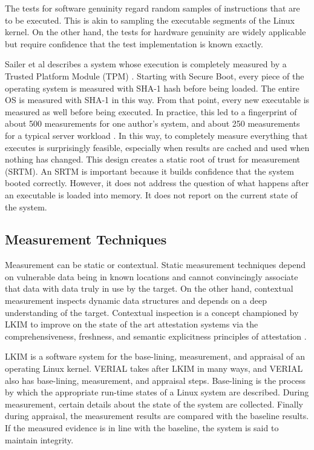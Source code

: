 \documentclass[a4paper,twoside]{article}
\begin{document}
The tests for software genuinity regard random samples of instructions that are to be executed. This is akin to sampling the executable segments of the Linux kernel. On the other hand, the tests for hardware genuinity are widely applicable but require confidence that the test implementation is known exactly.

Sailer et al describes a system whose execution is completely measured by a Trusted Platform Module (TPM) \cite{TCGIMA}. Starting with Secure Boot, every piece of the operating system is measured with SHA-1 hash before being loaded. The entire OS is measured with SHA-1 in this way. From that point, every new executable is measured as well before being executed. In practice, this led to a fingerprint of about 500 measurements for one author's system, and about 250 measurements for a typical server workload \cite{TCGIMA}. In this way, to completely measure everything that executes is surprisingly feasible, especially when results are cached and used when nothing has changed. This design creates a static root of trust for measurement (SRTM). An SRTM is important because it builds confidence that the system booted correctly. However, it does not address the question of what happens after an executable is loaded into memory. It does not report on the current state of the system.

\subsection{Measurement Techniques}

Measurement can be static or contextual. Static measurement techniques depend on vulnerable data being in known locations and cannot convincingly associate that data with data truly in use by the target. On the other hand, contextual measurement inspects dynamic data structures and depends on a deep understanding of the target. Contextual inspection is a concept championed by LKIM to improve on the state of the art attestation systems via the comprehensiveness, freshness, and semantic explicitness principles of attestation \cite{LKIMPaid}.

LKIM \cite{LKIMsmall, LKIMPaid} is a software system for the base-lining, measurement, and appraisal of an operating Linux kernel. VERIAL takes after LKIM in many ways, and VERIAL also has base-lining, measurement, and appraisal steps. Base-lining is the process by which the appropriate run-time states of a Linux system are described. During measurement, certain details about the state of the system are collected. Finally during appraisal, the measurement results are compared with the baseline results. If the measured evidence is in line with the baseline, the system is said to maintain integrity.
\end{document}
